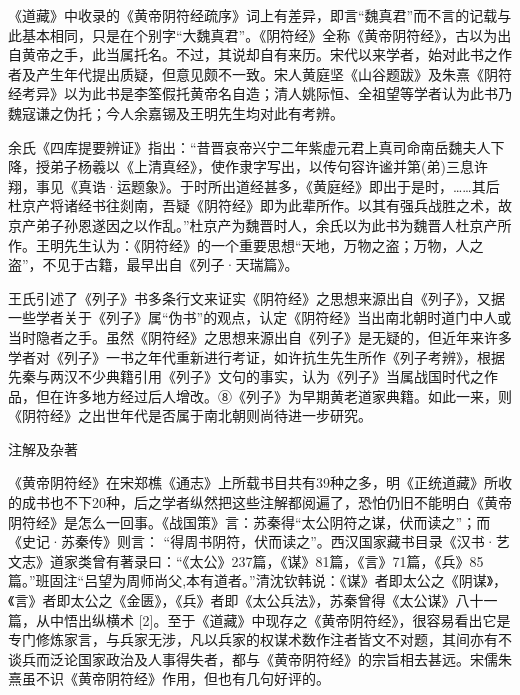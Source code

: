 \documentclass[12pt,UTF8]{ctexbook}
\begin{document}
《道藏》中收录的《黄帝阴符经疏序》词上有差异，即言“魏真君”而不言的记载与此基本相同，只是在个别字“大魏真君”。《阴符经》全称《黄帝阴符经》，古以为出自黄帝之手，此当属托名。不过，其说却自有来历。宋代以来学者，始对此书之作者及产生年代提出质疑，但意见颇不一致。宋人黄庭坚《山谷题跋》及朱熹《阴符经考异》以为此书是李筌假托黄帝名自造；清人姚际恒、全祖望等学者认为此书乃魏寇谦之伪托；今人余嘉锡及王明先生均对此有考辨。

余氏《四库提要辨证》指出：“昔晋哀帝兴宁二年紫虚元君上真司命南岳魏夫人下降，授弟子杨羲以《上清真经》，使作隶字写出，以传句容许谧并第(弟)三息许翔，事见《真诰·运题象》。于时所出道经甚多，《黄庭经》即出于是时，……其后杜京产将诸经书往剡南，吾疑《阴符经》即为此辈所作。以其有强兵战胜之术，故京产弟子孙恩遂因之以作乱。”杜京产为魏晋时人，余氏以为此书为魏晋人杜京产所作。王明先生认为：《阴符经》的一个重要思想“天地，万物之盗；万物，人之盗”，不见于古籍，最早出自《列子·天瑞篇》。

王氏引述了《列子》书多条行文来证实《阴符经》之思想来源出自《列子》，又据一些学者关于《列子》属“伪书”的观点，认定《阴符经》当出南北朝时道门中人或当时隐者之手。虽然《阴符经》之思想来源出自《列子》是无疑的，但近年来许多学者对《列子》一书之年代重新进行考证，如许抗生先生所作《列子考辨》，根据先秦与两汉不少典籍引用《列子》文句的事实，认为《列子》当属战国时代之作品，但在许多地方经过后人增改。⑧《列子》为早期黄老道家典籍。如此一来，则《阴符经》之出世年代是否属于南北朝则尚待进一步研究。

注解及杂著

《黄帝阴符经》在宋郑樵《通志》上所载书目共有39种之多，明《正统道藏》所收的成书也不下20种，后之学者纵然把这些注解都阅遍了，恐怕仍旧不能明白《黄帝阴符经》是怎么一回事。《战国策》言：苏秦得“太公阴符之谋，伏而读之”；而《史记·苏秦传》则言： “得周书阴符，伏而读之”。西汉国家藏书目录《汉书·艺文志》道家类曾有著录曰：“《太公》237篇，《谋》81篇，《言》71篇，《兵》85篇。”班固注“吕望为周师尚父,本有道者。”清沈钦韩说：《谋》者即太公之《阴谋》，《言》者即太公之《金匮》，《兵》者即《太公兵法》，苏秦曾得《太公谋》八十一篇，从中悟出纵横术 [2]。至于《道藏》中现存之《黄帝阴符经》，很容易看出它是专门修炼家言，与兵家无涉，凡以兵家的权谋术数作注者皆文不对题，其间亦有不谈兵而泛论国家政治及人事得失者，都与《黄帝阴符经》的宗旨相去甚远。宋儒朱熹虽不识《黄帝阴符经》作用，但也有几句好评的。
\end{document}
